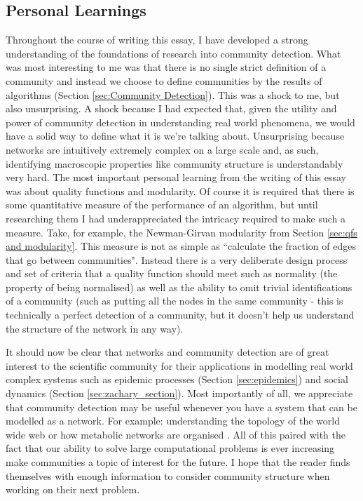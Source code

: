 \subsection{Personal Learnings}
Throughout the course of writing this essay, I have developed a strong understanding of the foundations of research into community detection. What was most interesting to me was that there is no single strict definition of a community and instead we choose to define communities by the results of algorithms (Section \ref{sec:Community Detection}). This was a shock to me, but also unsurprising. A shock because I had expected that, given the utility and power of community detection in understanding real world phenomena, we would have a solid way to define what it is we're talking about. Unsurprising because networks are intuitively extremely complex on a large scale and, as such, identifying macroscopic properties like community structure is understandably very hard. The most important personal learning from the writing of this essay was about quality functions and modularity. Of course it is required that there is some quantitative measure of the performance of an algorithm, but until researching them I had underappreciated the intricacy required to make such a measure. Take, for example, the Newman-Girvan modularity from Section \ref{sec:qfs and modularity}. This measure is not as simple as ``calculate the fraction of edges that go between communities". Instead there is a very deliberate design process and set of criteria that a quality function should meet such as normality (the property of being normalised) as well as the ability to omit trivial identifications of a community (such as putting all the nodes in the same community - this is technically a perfect detection of a community, but it doesn't help us understand the structure of the network in any way).

It should now be clear that networks and community detection are of great interest to the scientific community for their applications in modelling real world complex systems such as epidemic processes (Section \ref{sec:epidemics}) and social dynamics (Section \ref{sec:zachary_section}). Most importantly of all, we appreciate that community detection may be useful whenever you have a system that can be modelled as a network. For example: understanding the topology of the world wide web \cite{BARABASI200069} or how metabolic networks are organised \cite{Jeong2000}. All of this paired with the fact that our ability to solve large computational problems is ever increasing make communities a topic of interest for the future. I hope that the reader finds themselves with enough information to consider community structure when working on their next problem.
